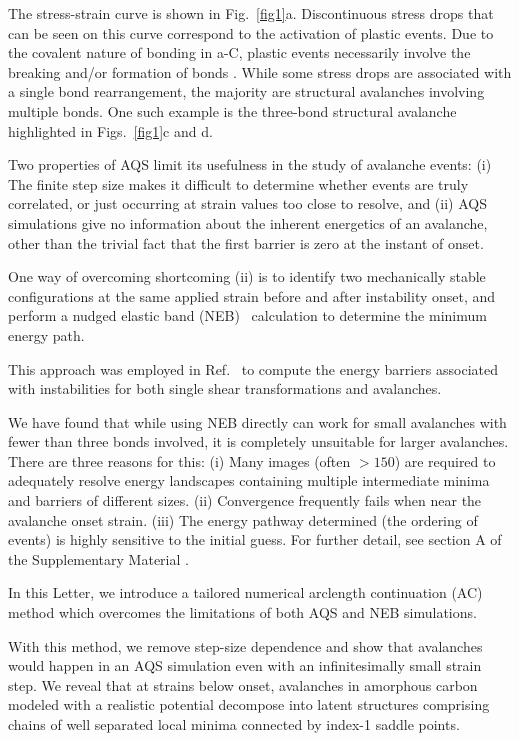 \documentclass[aps,prl,reprint,superscriptaddress]{revtex4-2}
\begin{document}
The stress-strain curve is shown in Fig.~\ref{fig1}a. Discontinuous stress drops that can be seen on this curve correspond to the activation of plastic events. Due to the covalent nature of bonding in a-C, plastic events necessarily involve the breaking and/or formation of bonds \cite{Kunze_2014}. While some stress drops are associated with a single bond rearrangement, the majority are structural avalanches involving multiple bonds. One such example is the three-bond structural avalanche highlighted in Figs.~\ref{fig1}c and d.

Two properties of AQS limit its usefulness in the study of avalanche events: (i) The finite step size makes it difficult to determine whether events are truly correlated, or just occurring at strain values too close to resolve, and (ii) AQS simulations give no information about the inherent energetics of an avalanche, other than the trivial fact that the first barrier is zero at the instant of onset.

One way of overcoming shortcoming (ii) is to identify two mechanically stable configurations at the same applied strain before and after instability onset, and perform a nudged elastic band (NEB)~\cite{Henkelman2000CI-NEB, Henkelman2000NEB} calculation to determine the minimum energy path.

This approach was employed in Ref.~\cite{Rodney2011MSMSE} to compute the energy barriers associated with instabilities for both single shear transformations and avalanches.

We have found that while using NEB directly can work for small avalanches with fewer than three  bonds involved, it is completely unsuitable for larger avalanches. There are three reasons for this: (i) Many images (often $>150$) are required to adequately resolve energy landscapes containing multiple intermediate minima and barriers of different sizes. (ii) Convergence frequently fails when near the avalanche onset strain. (iii) The energy pathway determined (the ordering of events) is highly sensitive to the initial guess. For further detail, see section A of the Supplementary Material \cite{SupplementalA}.

In this Letter, we introduce a tailored numerical arclength continuation (AC) method which overcomes the limitations of both AQS and NEB simulations.

With this method, we remove step-size dependence and show that avalanches would happen in an AQS simulation even with an infinitesimally small strain step. We reveal that at strains below onset, avalanches in amorphous carbon modeled with a realistic potential decompose into latent structures comprising chains of well separated local minima connected by index-1 saddle points.
\end{document}
